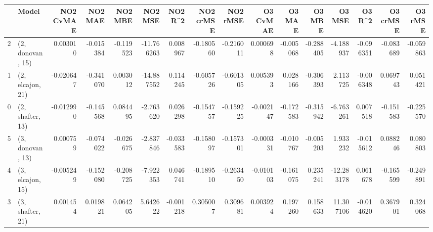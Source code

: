 \begin{tabular}{llrrrrrrrrrrrrrr}
\toprule
{} &             Model &  NO2 CvMAE &   NO2 MAE &   NO2 MBE &    NO2 MSE &   NO2 R\textasciicircum2 &  NO2 crMSE &  NO2 rMSE &  O3 CvMAE &    O3 MAE &    O3 MBE &     O3 MSE &    O3 R\textasciicircum2 &  O3 crMSE &   O3 rMSE \\
\midrule
2 &  (2, donovan, 15) &   0.003010 & -0.015384 & -0.119523 & -11.766263 &  0.008967 &  -0.180560 & -0.216011 &  0.000698 & -0.005068 & -0.288405 &  -4.188937 & -0.096351 & -0.083689 & -0.059863 \\
1 &  (2, elcajon, 21) &  -0.020647 & -0.341070 &  0.003012 & -14.887552 &  0.114245 &  -0.605726 & -0.601305 &  0.005393 &  0.028166 & -0.306393 &   2.113725 & -0.006348 &  0.069743 &  0.051421 \\
0 &  (2, shafter, 13) &  -0.012990 & -0.145568 &  0.084495 &  -2.763620 &  0.026298 &  -0.154757 & -0.159225 & -0.002147 & -0.172583 & -0.315942 &  -6.763261 &  0.007518 & -0.151583 & -0.225570 \\
5 &  (3, donovan, 13) &   0.000759 & -0.074022 & -0.026675 &  -2.837846 & -0.033583 &  -0.158097 & -0.157301 & -0.000331 & -0.010767 & -0.005203 &   1.933232 & -0.015612 &  0.088246 &  0.080803 \\
4 &  (3, elcajon, 15) &  -0.005249 & -0.152080 & -0.208725 &  -7.922353 &  0.046741 &  -0.189510 & -0.263450 & -0.010103 & -0.161075 &  0.235241 & -12.283178 &  0.061678 & -0.165599 & -0.249891 \\
3 &  (3, shafter, 21) &   0.001454 &  0.019821 &  0.064205 &   5.642622 & -0.001218 &   0.305007 &  0.309681 &  0.003924 &  0.197260 &  0.158633 &  11.307106 & -0.014620 &  0.367901 &  0.324068 \\
\bottomrule
\end{tabular}
